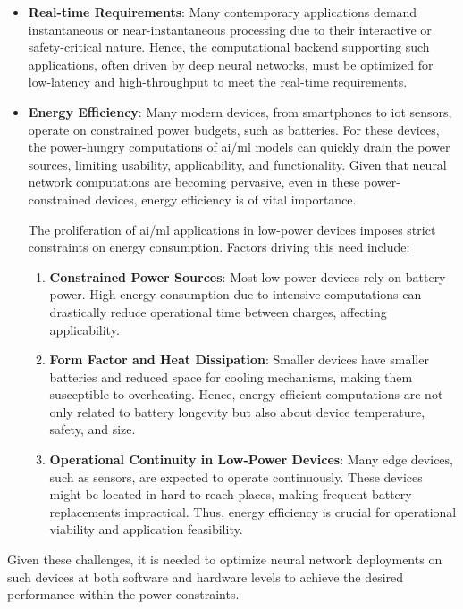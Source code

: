 \begin{itemize}
	\item \textbf{Real-time Requirements}:
	Many contemporary applications demand instantaneous or near-instantaneous processing due to their interactive or safety-critical nature. Hence, the computational backend supporting such applications, often driven by deep neural networks, must be optimized for low-latency and high-throughput to meet the real-time requirements.
	
	\item \textbf{Energy Efficiency}: Many modern devices, from smartphones to \gls{iot} sensors, operate on constrained power budgets, such as batteries. For these devices, the power-hungry computations of \gls{ai}/\gls{ml} models can quickly drain the power sources, limiting usability, applicability, and functionality. Given that neural network computations are becoming pervasive, even in these power-constrained devices, energy efficiency is of vital importance.
	
	The proliferation of \gls{ai}/\gls{ml} applications in low-power devices imposes strict constraints on energy consumption. Factors driving this need include:
	
	\begin{enumerate}
		\item \textbf{Constrained Power Sources}: Most low-power devices rely on battery power. High energy consumption due to intensive computations can drastically reduce operational time between charges, affecting applicability.
		
		\item \textbf{Form Factor and Heat Dissipation}: Smaller devices have smaller batteries and reduced space for cooling mechanisms, making them susceptible to overheating. Hence, energy-efficient computations are not only related to battery longevity but also about device temperature, safety, and size.
		
		\item \textbf{Operational Continuity in Low-Power Devices}: Many edge devices, such as sensors, are expected to operate continuously. These devices might be located in hard-to-reach places, making frequent battery replacements impractical. Thus, energy efficiency is crucial for operational viability and application feasibility.
	\end{enumerate}
	
\end{itemize}

Given these challenges, it is needed to optimize neural network deployments on such devices at both software and hardware levels to achieve the desired performance within the power constraints.

